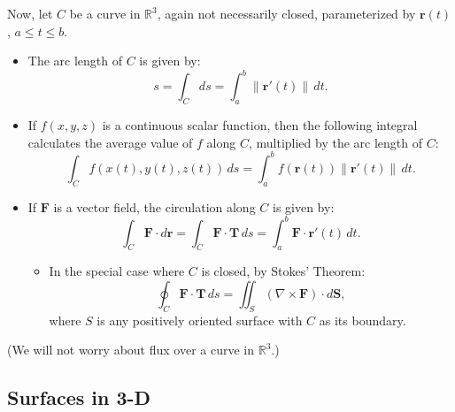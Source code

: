 \documentclass[10pt]{article}
\newcommand{\mb}[1]{\mathbf{#1}}
\newcommand{\vecfuc}[2]{\mb{#1}(#2)}
\newcommand{\dvecfuc}[2]{\mb{#1}'(#2)}
\newcommand{\normdvecfuc}[2]{\| \mb{#1}'(#2) \|}
\newcommand{\R}{\mathbb{R}}
\begin{document}
Now, let \(C\) be a curve in \(\R^{3}\), again not necessarily closed, parameterized by \(\vecfuc{r}{t}\), \(a \leq t \leq b\).
\begin{itemize}
    \item The arc length of \(C\) is given by:
    \[
        s = \displaystyle\int_{C} ds = \int_{a}^{b} \normdvecfuc{r}{t} \, dt.
    \]
    \item If \(f(x,y,z)\) is a continuous scalar function, then the following integral calculates the average value of \(f\) along \(C\), multiplied by the arc length of \(C\):
    \[
        \int_{C} f(x(t), y(t), z(t)) \, ds = \int_{a}^{b} f(\vecfuc{r}{t}) \normdvecfuc{r}{t} \, dt.
    \]
    \item If \(\mb{F}\) is a vector field, the circulation along \(C\) is given by:
    \[
        \int_{C} \mb{F} \cdot d\mb{r} = \int_{C} \mb{F} \cdot \mb{T} \, ds = \int_{a}^{b} \mb{F} \cdot \dvecfuc{r}{t} \, dt.
    \]
    \begin{itemize}
        \item In the special case where \(C\) is closed, by Stokes’ Theorem:
        \[
            \oint_{C} \mb{F} \cdot \mb{T} \, ds = \iint_{S} (\nabla \times \mb{F}) \cdot d\mb{S},
        \]
        where \(S\) is any positively oriented surface with \(C\) as its boundary.
    \end{itemize}
\end{itemize}
(We will not worry about flux over a curve in \(\R^{3}\).)

\subsection*{Surfaces in 3-D}
\end{document}
